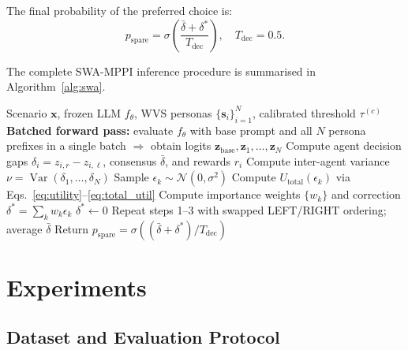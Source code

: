 \documentclass{article}
\begin{document}
The final probability of the preferred choice is:
\begin{equation}
    p_\text{spare} = \sigma\!\left(\frac{\bar\delta + \delta^*}{T_\text{dec}}\right),
    \quad T_\text{dec} = 0.5.
    \label{eq:final}
\end{equation}

The complete SWA-MPPI inference procedure is summarised in Algorithm~\ref{alg:swa}.

\begin{algorithm}[t]
\caption{SWA-MPPI Inference for Country $c$}
\label{alg:swa}
\begin{algorithmic}[1]
\Require Scenario $\mathbf{x}$, frozen LLM $f_\theta$, WVS personas
    $\{\mathbf{s}_i\}_{i=1}^{N}$, calibrated threshold $\tau^{(c)}$
\State \textbf{Batched forward pass:} evaluate $f_\theta$ with base prompt and all
    $N$ persona prefixes in a single batch $\Rightarrow$ obtain logits
    $\mathbf{z}_\text{base}, \mathbf{z}_1, \ldots, \mathbf{z}_N$
\State Compute agent decision gaps $\delta_i = z_{i,r} - z_{i,\ell}$,
    consensus $\bar\delta$, and rewards $r_i$ 
\State Compute inter-agent variance $\nu = \operatorname{Var}(\delta_1, \ldots, \delta_N)$
 
        \State Sample $\epsilon_k \sim \mathcal{N}(0, \sigma^2)$
        \State Compute $U_\text{total}(\epsilon_k)$ via Eqs.~\ref{eq:utility}--\ref{eq:total_util}
    \EndFor
    \State Compute importance weights $\{w_k\}$ and correction $\delta^* = \sum_k w_k \epsilon_k$
\Else
    \State $\delta^* \leftarrow 0$
\EndIf
\State Repeat steps 1--3 with swapped LEFT/RIGHT ordering; average $\bar\delta$
\State Return $p_\text{spare} = \sigma((\bar\delta + \delta^*) / T_\text{dec})$
\end{algorithmic}
\end{algorithm}

\section{Experiments}
\label{sec:experiments}

\subsection{Dataset and Evaluation Protocol}
\label{sec:exp:data}
\end{document}
